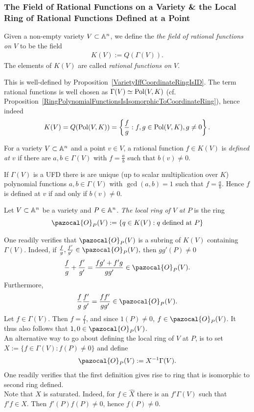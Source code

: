 \subsubsection{The Field of Rational Functions on a Variety \& the Local Ring of Rational Functions Defined at a Point}
\begin{definition}
    Given a non-empty variety $V\subset \mathbb{A}^n$, we define the \textit{the field of rational functions on $V$} to be the field
    \begin{gather*}
        K(V):= Q(\Gamma(V)). 
    \end{gather*}
    The elements of $K(V)$ are called \textit{rational functions on $V$}.
\end{definition}
\begin{remark}
    This is well-defined by Proposition~\ref{VarietyIffCoordinateRingIsID}. The term rational functions is well chosen as $\Gamma(V)\simeq \mathrm{Pol}(V,K)$ (cf. Proposition~\ref{RingPolynomialFunctionsIsIsomorphicToCoordinateRing}), hence indeed 
    $$K(V) = Q(\mathrm{Pol}(V,K))=\left\{\frac{f}{g} : f,g\in \mathrm{Pol}(V,K), g\neq0 \right\}.$$
\end{remark}
\begin{definition}
    For a variety $V\subset \mathbb{A}^n$ and a point $v\in V$, a rational function $f\in K(V)$ is \textit{defined at $v$} if there are $a,b\in \Gamma(V)$ with $f=\frac{a}{b}$ such that $b(v)\neq 0$.  
\end{definition}
\begin{remark}
    If $\Gamma(V)$ is a UFD there is are unique (up to scalar multiplication over $K$) polynomial functions $a,b\in \Gamma(V)$ with $\gcd(a,b)=1$ such that $f=\frac{a}{b}$. Hence $f$ is defined at $v$ if and only if $b(v)\neq0$.
\end{remark}
\begin{definition}
    Let $V\subset \mathbb{A}^n$ be a variety and $P\in \mathbb{A}^n$. \textit{The local ring of $V$ at $P$} is the ring 
    $$\pazocal{O}_P(V) := \left\{ q\in K(V) : q \text{ defined at } P\right\}$$
\end{definition}
\begin{remark}\label{SomeRemarksAboutTheLocalRingAtAPoint}
    One readily verifies that $\pazocal{O}_P(V)$ is a subring of $K(V)$ containing $\Gamma(V)$. Indeed, if $\frac{f}{g},\frac{f'}{g'}\in \pazocal{O}_P(V),$ then $gg'(P)\neq 0$  
    $$\frac{f}{g}+\frac{f'}{g'}=\frac{fg'+f'g}{gg'}\in \pazocal{O}_P(V).$$
    Furthermore,
    $$\frac{f}{g}\frac{f'}{g'}=\frac{ff'}{gg'}\in \pazocal{O}_P(V).$$
    Let $f\in \Gamma(V)$. Then $f=\frac{f}{1}$, and since $1(P)\neq0$, $f\in\pazocal{O}_P(V)$. It thus also follows that $1,0\in\pazocal{O}_P(V)$.\\
    An alternative way to go about defining the local ring of $V$ at $P$, is to set $X := \{ f\in \Gamma(V) : f(P)\neq 0\}$ and define 
    $$\pazocal{O}_P(V):= X^{-1}\Gamma(V).$$
    One readily verifies that the first definition gives rise to ring that is isomorphic to second ring defined.\\ 
    Note that $X$ is saturated. Indeed, for $f\in \widehat{X}$ there is an $f'\Gamma(V)$ such that $f'f\in X$. Then $f'(P)f(P)\neq 0$, hence $f(P)\neq 0$.  
\end{remark}
